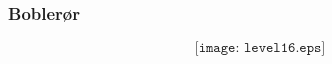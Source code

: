 \documentclass[aspectratio=169,xcolor=dvipsnames]{beamer}
\begin{document}
%
%
%
\begin{frame}
	\frametitle{Boblerør}

	$$\texttt{[image: level16.eps]}$$
\end{frame}
%
%
\end{document}
